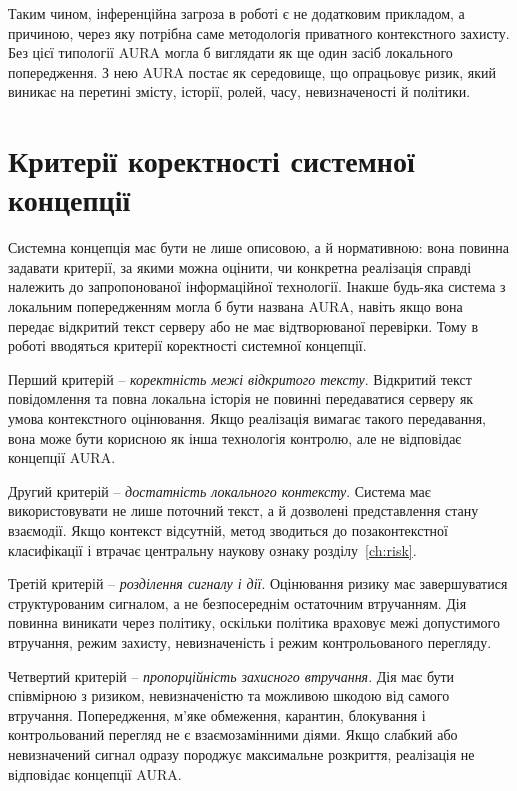 Таким чином, інференційна загроза в роботі є не додатковим прикладом, а причиною, через яку потрібна саме методологія приватного контекстного захисту. Без цієї типології AURA могла б виглядати як ще один засіб локального попередження. З нею AURA постає як середовище, що опрацьовує ризик, який виникає на перетині змісту, історії, ролей, часу, невизначеності й політики.

\section{Критерії коректності системної концепції}
\label{sec:concept-correctness}

Системна концепція має бути не лише описовою, а й нормативною: вона повинна задавати критерії, за якими можна оцінити, чи конкретна реалізація справді належить до запропонованої інформаційної технології. Інакше будь-яка система з локальним попередженням могла б бути названа AURA, навіть якщо вона передає відкритий текст серверу або не має відтворюваної перевірки. Тому в роботі вводяться критерії коректності системної концепції.

Перший критерій -- \emph{коректність межі відкритого тексту}. Відкритий текст повідомлення та повна локальна історія не повинні передаватися серверу як умова контекстного оцінювання. Якщо реалізація вимагає такого передавання, вона може бути корисною як інша технологія контролю, але не відповідає концепції AURA.

Другий критерій -- \emph{достатність локального контексту}. Система має використовувати не лише поточний текст, а й дозволені представлення стану взаємодії. Якщо контекст відсутній, метод зводиться до позаконтекстної класифікації і втрачає центральну наукову ознаку розділу~\ref{ch:risk}.

Третій критерій -- \emph{розділення сигналу і дії}. Оцінювання ризику має завершуватися структурованим сигналом, а не безпосереднім остаточним втручанням. Дія повинна виникати через політику, оскільки політика враховує межі допустимого втручання, режим захисту, невизначеність і режим контрольованого перегляду.

Четвертий критерій -- \emph{пропорційність захисного втручання}. Дія має бути співмірною з ризиком, невизначеністю та можливою шкодою від самого втручання. Попередження, м'яке обмеження, карантин, блокування і контрольований перегляд не є взаємозамінними діями. Якщо слабкий або невизначений сигнал одразу породжує максимальне розкриття, реалізація не відповідає концепції AURA.

